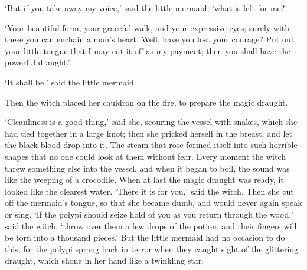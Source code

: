 `But if you take away my voice,' said the little mermaid, `what is
left for me?'

`Your beautiful form, your graceful walk, and your expressive
eyes; surely with these you can enchain a man's heart. 
Well, have
you lost your courage? Put out your little tongue that I may cut it
off as my payment; then you shall have the powerful draught.'

`It shall be,' said the little mermaid.

Then the witch placed her cauldron on the fire, to prepare the
magic draught.

`Cleanliness is a good thing,' said she, scouring the vessel
with snakes, which she had tied together in a large knot; then she
pricked herself in the breast, and let the black blood drop into it.
The steam that rose formed itself into such horrible shapes that no
one could look at them without fear. 
Every moment the witch threw
something else into the vessel, and when it began to boil, the sound
was like the weeping of a crocodile. 
When at last the magic draught
was ready, it looked like the clearest water. 
`There it is for you,'
said the witch. 
Then she cut off the mermaid's tongue, so that she
became dumb, and would never again speak or sing. 
`If the polypi
should seize hold of you as you return through the wood,' said the
witch, `throw over them a few drops of the potion, and their fingers
will be torn into a thousand pieces.' But the little mermaid had no
occasion to do this, for the polypi sprang back in terror when they
caught sight of the glittering draught, which shone in her hand like a
twinkling star.

